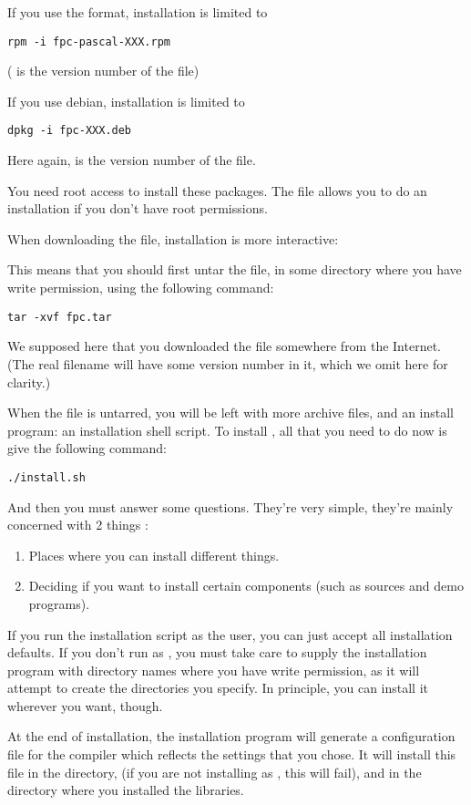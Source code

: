 \documentclass{report}
\begin{document}
If you use the  format, installation is limited to
\begin{verbatim}
rpm -i fpc-pascal-XXX.rpm
\end{verbatim}
( is the version number of the  file)

If you use debian, installation is limited to 
\begin{verbatim}
dpkg -i fpc-XXX.deb
\end{verbatim}
Here again,  is the version number of the  file.

You need root access to install these packages. The  file
allows you to do an installation if you don't have root permissions.

When downloading the  file, installation is more interactive:

This means that you should first untar the file, in some directory where 
you have write permission, using the following command:
\begin{verbatim}
tar -xvf fpc.tar
\end{verbatim}
We supposed here that you downloaded the file  somewhere
from the Internet. (The real filename will have some version number in it, 
which we omit here for clarity.)

When the file is untarred, you will be left with more archive files, and
an install program: an installation shell script.
To install \fpc, all that you need to do now is give the following command:
\begin{verbatim}
./install.sh
\end{verbatim}
And then you must answer some questions. They're very simple, they're
mainly concerned with 2 things :
\begin{enumerate}
\item Places where you can install different things.
\item Deciding if you want to install certain components (such as sources
and demo programs).
\end{enumerate}
If you run the installation script as the  user, you can just accept all installation
defaults. If you don't run as , you must take care to supply the
installation program with directory names where you have write permission,
as it will attempt to create the directories you specify.
In principle, you can install it wherever you want, though.

At the end of installation, the installation program will generate a
configuration file for the \fpc compiler which reflects the settings
that you chose. It will install this file in the  directory, (if
you are not installing as , this will fail), and in the
directory where you installed the libraries.
\end{document}
